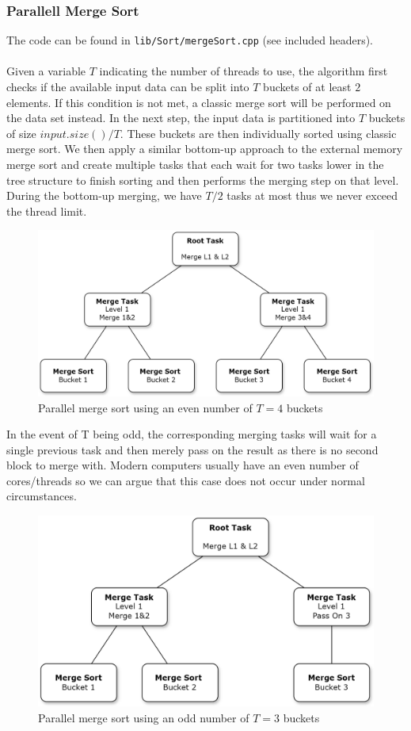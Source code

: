 \documentclass[twocolumn]{article}
\begin{document}
\subsubsection{Parallell Merge Sort}
The code can be found in \texttt{lib/Sort/mergeSort.cpp} (see included headers).\\
\\
Given a variable $T$ indicating the number of threads to use, the algorithm first checks if the available input data can be split into $T$ buckets of at least $2$ elements. 
If this condition is not met, a classic merge sort will be performed on the data set instead.
In the next step, the input data is partitioned into $T$ buckets of size $input.size()/T$.  
These buckets are then individually sorted using classic merge sort. 
We then apply a similar bottom-up approach to the external memory merge sort and create multiple tasks that each wait for two tasks lower in the tree structure to finish sorting and then performs the merging step on that level. 
During the bottom-up merging, we have $T/2$ tasks at most thus we never exceed the thread limit.
\begin{figure}[h]
    \includegraphics[scale=0.175]{./figures/merge_sort_even.png}
    \centering
    \caption{Parallel merge sort using an even number of $T=4$ buckets}
    \end{figure}
In the event of T being odd, the corresponding merging tasks will wait for a single previous task and then merely pass on the result as there is no second block to merge with. 
Modern computers usually have an even number of cores/threads so we can argue that this case does not occur under normal circumstances.
\begin{figure}[h]
\includegraphics[scale=0.175]{./figures/merge_sort_odd.png}
\centering
\caption{Parallel merge sort using an odd number of $T=3$ buckets}
\end{figure}
\end{document}
